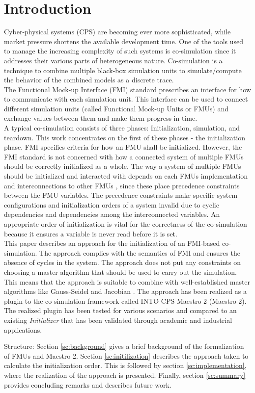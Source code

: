 \section{Introduction}\label{sc:introduction}
Cyber-physical systems (CPS) are becoming ever more sophisticated, while market pressure shortens the available development time. One of the tools used to manage the increasing complexity of such systems is co-simulation since it addresses their various parts of heterogeneous nature. Co-simulation is a technique to combine multiple black-box simulation units to simulate/compute the behavior of the combined models as a discrete trace\cite{Kubler2000}. \\
The Functional Mock-up Interface (FMI) standard \cite{Blochwitz2012, fmi_2019} prescribes an interface for how to communicate with each simulation unit. This interface can be used to connect different simulation units (called Functional Mock-up Units or FMUs) and exchange values between them and make them progress in time. \\
A typical co-simulation consists of three phases: Initialization, simulation, and teardown. This work concentrates on the first of these phases - the initialization phase. FMI specifies criteria for how an FMU shall be initialized. However, the FMI standard is not concerned with how a connected system of multiple FMUs should be correctly initialized as a whole. 
The way a system of multiple FMUs should be initialized and interacted with depends on each FMUs implementation and interconnections to other FMUs \cite{gomes_lucio_vangheluwe_2019}, since these place precedence constraints between the FMU variables. The precedence constraints make specific system configurations and initialization orders of a system invalid due to cyclic dependencies and dependencies among the interconnected variables. An appropriate order of initialization is vital for the correctness of the co-simulation \cite{Thule2018} because it ensures a variable is never read before it is set.\\
This paper describes an approach for the initialization of an FMI-based co-simulation. The approach complies with the semantics of FMI and ensures the absence of cycles in the system. The approach does not put any constraints on choosing a master algorithm that should be used to carry out the simulation. This means that the approach is suitable to combine with well-established master algorithms like Gauss-Seidel and Jacobian \cite{Palensky2017}. The approach has been realized as a plugin to the co-simulation framework called INTO-CPS Maestro 2 (Maestro 2). The realized plugin has been tested for various scenarios and compared to an existing \textit{Initializer} that has been validated through academic and industrial applications.

\noindent Structure: Section \ref{sc:background} gives a brief background of the formalization of FMUs and Maestro 2. Section \ref{sc:initilization} describes the approach taken to calculate the initialization order. This is followed by section \ref{sc:implementation}, where the realization of the approach is presented. Finally, section \ref{sc:summary} provides concluding remarks and describes future work.